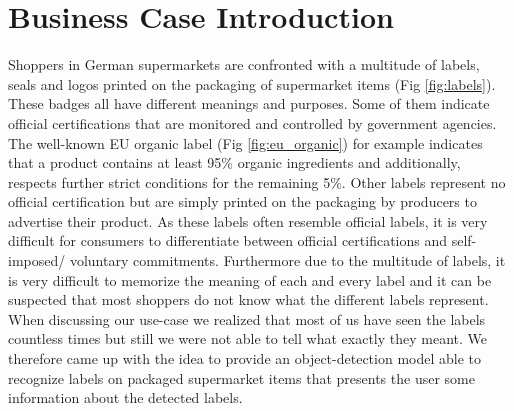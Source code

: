 \setcounter{section}{0} %
\section{Business Case Introduction}
\label{sec:intro}
Shoppers in German supermarkets are confronted with a multitude of labels, seals and logos printed on the packaging of supermarket items (Fig \ref{fig:labels}). These badges all have different meanings and purposes. Some of them indicate official certifications that are monitored and controlled by government agencies. The well-known EU organic label (Fig \ref{fig:eu_organic}) for example indicates that a product contains at least 95\% organic ingredients and additionally, respects further strict conditions for the remaining 5\%. Other labels represent no official certification but are simply printed on the packaging by producers to advertise their product. As these labels often resemble official labels, it is very difficult for consumers to differentiate between official certifications and self-imposed/ voluntary commitments. Furthermore due to the multitude of labels, it is very difficult to memorize the meaning of each and every label and it can be suspected that most shoppers do not know what the different labels represent. When discussing our use-case we realized that most of us have seen the labels countless times but still we were not able to tell what exactly they meant. We therefore came up with the idea to provide an object-detection model able to recognize labels on packaged supermarket items that presents the user some information about the detected labels. 

